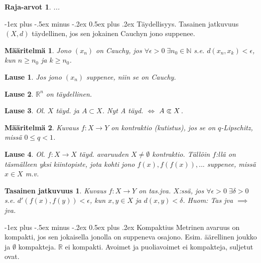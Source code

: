 \documentclass[landscape,a4paper,10pt]{article}
\makeatletter
\renewcommand{\section}{\@startsection{section}{1}{0mm}%
                                {-1ex plus -.5ex minus -.2ex}%
                                {0.5ex plus .2ex}%
                                {\color{blue}\normalfont\large\bfseries}}
\newcommand\cls{\mathrel{\ooalign{$\subset$\cr
\hidewidth\raise.225ex\hbox{$\text{{\scriptsize c}}\mkern2mu$}\cr}}}
\theoremstyle{customtheoremstyle}
\newtheorem*{theorem}{Lause}
\newtheorem*{definition}{Määritelmä}
\makeatother
\begin{document}
\begin{multicols*}{3}
\newtheorem*{defn:rajaarvot}{Raja-arvot}
\begin{defn:rajaarvot}
  ...
\end{defn:rajaarvot}

\section{Täydellisyys. Tasainen jatkuvuus}
$(X,d)$ täydellinen, jos sen jokainen Cauchyn jono suppenee.
\begin{definition}
  Jono $(x_n)$ on Cauchy, jos $\forall \epsilon > 0 \; \exists n_0 \in
  \mathbb{N}$ s.e. $d(x_n, x_k) < \epsilon$, kun $n \geq n_0$ ja $k \geq n_0$.
\end{definition}

\begin{theorem}
  Jos jono $(x_n)$ suppenee, niin se on Cauchy.
\end{theorem}

\begin{theorem}
  $\mathbb{R}^n$ on täydellinen.
\end{theorem}

\begin{theorem}
  Ol. $X$ täyd. ja $A \subset X$. Nyt A täyd. $\iff$ $A \cls X$.
\end{theorem}

\begin{definition}
  Kuvaus $f: X \rightarrow Y$ on kontraktio (kutistus), jos se on
  $q$-Lipschitz, missä $0 \leq q < 1$.
\end{definition}

\begin{theorem}
  Ol. $f: X \rightarrow X$ täyd. avaruuden $X \neq \emptyset$ kontraktio.
  Tällöin $f$:llä on täsmälleen yksi kiintopiste, jota kohti jono $f(x),
  f(f(x)), ...$ suppenee, missä $x \in X$ m.v.
\end{theorem}

\newtheorem*{defn:tasjva}{Tasainen jatkuvuus}
\begin{defn:tasjva}
  Kuvaus $f: X \rightarrow Y$ on tas.jva. $X$:ssä, jos $\forall \epsilon > 0 \;
  \exists \delta > 0$ s.e. $d'(f(x), f(y)) < \epsilon$, kun $x,y \in X$ ja
  $d(x,y) < \delta$. Huom: Tas jva $\implies$ jva.
\end{defn:tasjva}



\section{Kompaktius}
Metrinen avaruus on kompakti, jos sen jokaisella jonolla on suppeneva osajono.
Esim. äärellinen joukko ja $\emptyset$ kompakteja. $\mathbb{R}$ ei kompakti.
Avoimet ja puoliavoimet ei kompakteja, suljetut ovat.


\end{multicols*}
\end{document}
